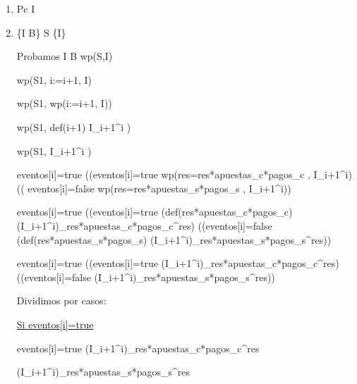 \documentclass[10pt,a4paper]{article}
\begin{document}
	\vspace{5mm}
	
	\begin{enumerate}
		\item Pc \implica \hspace{2} I
		
		\item{\{I \wedge B\} S \{I\}}
		\vspace{2mm}
	
		Probamos I \wedge B \implica wp(S,I)
		\vspace{2mm}
	
		wp(S1, i:=i+1, I)
		\vspace{2mm}
		
		\equiv wp(S1, wp(i:=i+1, I))
		\vspace{2mm}
		
		\equiv wp(S1, def(i+1) \yLuego I_{i+1}^i )
		\vspace{2mm}
	
		\equiv wp(S1, I_{i+1}^i )
		\vspace{2mm}
	
		\equiv eventos[i]=true \yLuego ((eventos[i]=true \wedge wp(res=res*apuestas_c*pagos_c , I_{i+1}^i) \vee (( eventos[i]=false \wedge wp(res=res*apuestas_s*pagos_s , I_{i+1}^i))
		\vspace{2mm}
	
		\equiv eventos[i]=true \yLuego ((eventos[i]=true \wedge (def(res*apuestas_c*pagos_c) \yLuego (I_{i+1}^i)_{res*apuestas_c*pagos_c}^{res}) \vee ((eventos[i]=false \wedge (def(res*apuestas_s*pagos_s) \yLuego (I_{i+1}^i)_{res*apuestas_s*pagos_s}^{res}))
		\vspace{2mm}
	
		\equiv eventos[i]=true \yLuego ((eventos[i]=true \yLuego (I_{i+1}^i)_{res*apuestas_c*pagos_c}^{res}) \vee ((eventos[i]=false \yLuego (I_{i+1}^i)_{res*apuestas_s*pagos_s}^{res}))
		\vspace{2mm}
	
		Dividimos por casos:
		\vspace{2mm}
	
		
		\underline{Si eventos[i]=true}
		\vspace{2mm}
	
		eventos[i]=true \wedge (I_{i+1}^i)_{res*apuestas_c*pagos_c}^{res}
		\vspace{2mm}
	
		\equiv (I_{i+1}^i)_{res*apuestas_s*pagos_s}^{res}
		\vspace{2mm}
		

\end{enumerate}
\end{document}
